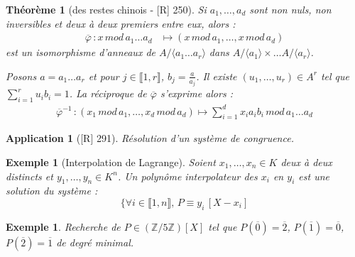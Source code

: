 \documentclass[10pt, a4paper, parskip=full, twoside, twocolumn]{report}
\newtheorem{theorem}[definition]{Théorème}
\newtheorem{example}[definition]{Exemple}
\newtheorem{application}[definition]{Application}
\newcommand{\IZ}{\mathbb{Z}}
\begin{document}
\begin{tcolorbox}[
    breakable, %
    colback=developpement, %
    colframe=gray!0!black, %
    boxrule=0pt, %
    arc=1mm, %
	boxsep=0pt,
	left=0pt, right=0pt, top=0pt, bottom=0pt
]
\begin{theorem}[des restes chinois - \textnormal{[R] 250}]
	\label{142dev11}
	Si $a_1,\dots, a_d$ sont non nuls, non inversibles et deux à deux premiers entre eux, alors :
	\begin{align*}
		\overline{\varphi}\,\colon x\,mod\,a_1\dots a_d &\mapsto (x\,mod\,a_1,\dots, x\, mod\, a_d)
	\end{align*}
	est un isomorphisme d'anneaux de $A/\langle a_1\dots a_r\rangle$ dans $A/\langle a_1\rangle \times \dots A/\langle a_r\rangle$.
	
	Posons $a = a_1\dots a_r$ et pour $j\in \llbracket 1,r\rrbracket$, $b_j = \frac{a}{a_j}$.
	Il existe $(u_1,\dots, u_r)\in A^r$ tel que $\sum_{i=1}^{r} u_ib_i = 1$.
	La réciproque de $\overline{\varphi}$ s'exprime alors :
	\begin{align*}
		\overline{\varphi}^{-1}\,\colon (x_1\,mod\,a_1,\dots, x_d\, mod\, a_d) \mapsto \sum_{i=1}^{d} x_i a_i b_i\, mod\, a_1\dots a_d
	\end{align*}
\end{theorem}
\end{tcolorbox}

\begin{application}[\textnormal{[R] 291}]
	Résolution d'un système de congruence.
\end{application}

\begin{example}[Interpolation de Lagrange]
	Soient $x_1,\dots, x_n\in K$ deux à deux distincts et $y_1,\dots,y_n\in K^n$.
	Un polynôme interpolateur des $x_i$ en $y_i$ est une solution du système : 
	$$\{ \forall i\in\llbracket 1, n\rrbracket,\, P\equiv y_i\,[X-x_i]$$
\end{example}

\begin{tcolorbox}[
    breakable, %
    colback=developpement, %
    colframe=gray!0!black, %
    boxrule=0pt, %
    arc=1mm, %
	boxsep=0pt,
	left=0pt, right=0pt, top=0pt, bottom=0pt
]
\begin{example}
	\label{142dev12}
	Recherche de $P\in \left(\IZ/5\IZ\right)[X]$ tel que 
	$P(\overline{0}) = \overline{2}$, $P(\overline{1}) = \overline{0}$, $P(\overline{2}) = \overline{1}$
	de degré minimal.
\end{example}
\end{tcolorbox}
\end{document}
